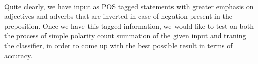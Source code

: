 \documentclass[conference]{IEEEtran}
\begin{document}
\hline
\\
Quite clearly, we have input as POS tagged statements with greater emphasis on
adjectives and adverbs that are inverted in case of negation present in the
preposition. Once we have this tagged information, we would like to test on
both the process of simple polarity count summation of the given input and
traning the classifier, in order to come up with the best possible result in
terms of accuracy.\\



%
%



%
%
\end{document}
